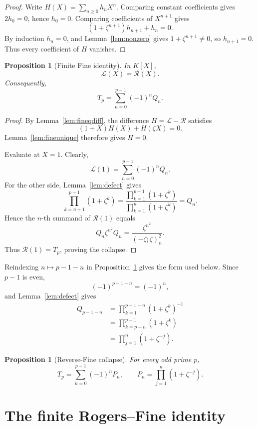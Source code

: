 \documentclass[11pt]{article}
\newtheorem{proposition}[theorem]{Proposition}
\theoremstyle{definition}
\begin{document}
\begin{proof}
Write $H(X)=\sum_{n\ge0}h_nX^n$. Comparing constant coefficients gives
$2h_0=0$, hence $h_0=0$. Comparing coefficients of $X^{n+1}$ gives
\[
  (1+\zeta^{n+1})h_{n+1}+h_n=0.
\]
By induction $h_n=0$, and Lemma~\ref{lem:nonzero} gives
$1+\zeta^{n+1}\ne0$, so $h_{n+1}=0$. Thus every coefficient of $H$ vanishes.
\end{proof}

\begin{proposition}[Finite Fine identity]\label{prop:fineeq}
In $K[X]$,
\[
  \mathcal L(X)=\mathcal R(X).
\]
Consequently,
\[
  T_p=\sum_{n=0}^{p-1}(-1)^nQ_n.
\]
\end{proposition}

\begin{proof}
By Lemma~\ref{lem:fineqdiff}, the difference
$H=\mathcal L-\mathcal R$ satisfies
\[
  (1+X)H(X)+H(\zeta X)=0.
\]
Lemma~\ref{lem:fineunique} therefore gives $H=0$.

Evaluate at $X=1$. Clearly,
\[
  \mathcal L(1)=\sum_{n=0}^{p-1}(-1)^nQ_n.
\]
For the other side, Lemma~\ref{lem:defect} gives
\[
  \prod_{k=n+1}^{p-1}(1+\zeta^k)
  =
  \frac{\prod_{k=1}^{p-1}(1+\zeta^k)}
       {\prod_{k=1}^{n}(1+\zeta^k)}
  =Q_n.
\]
Hence the $n$-th summand of $\mathcal R(1)$ equals
\[
  Q_n\zeta^{n^2}Q_n
  =
  \frac{\zeta^{n^2}}{(-\zeta;\zeta)_n^2}.
\]
Thus $\mathcal R(1)=T_p$, proving the collapse.
\end{proof}

Reindexing $n\mapsto p-1-n$ in Proposition~\ref{prop:fineeq} gives the form used below. Since $p-1$ is even,
\[
  (-1)^{p-1-n}=(-1)^n,
\]
and Lemma~\ref{lem:defect} gives
\[
\begin{aligned}
  Q_{p-1-n}
  &=
  \prod_{k=1}^{p-1-n}(1+\zeta^k)^{-1}\\
  &=
  \prod_{k=p-n}^{p-1}(1+\zeta^k)\\
  &=
  \prod_{j=1}^{n}(1+\zeta^{-j}).
\end{aligned}
\]

\begin{proposition}[Reverse-Fine collapse]\label{prop:reversefine}
For every odd prime $p$,
\begin{equation}\label{eq:reversefine}
  T_p
  =
  \sum_{n=0}^{p-1}(-1)^nP_n,
  \qquad
  P_n=\prod_{j=1}^{n}(1+\zeta^{-j}).
\end{equation}
\end{proposition}

\section{The finite Rogers--Fine identity}\label{sec:rogersfine}
\end{document}
